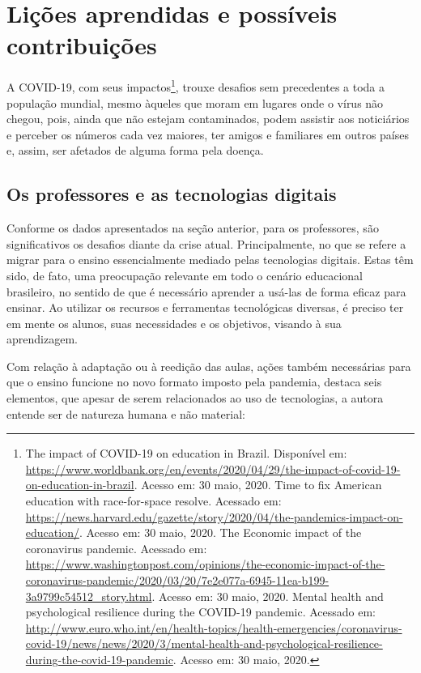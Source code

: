 \documentclass{textolivre}
\begin{document}
\section{Lições aprendidas e possíveis contribuições}\label{sec-licoes}
A COVID-19, com seus impactos\footnote{The impact of COVID-19 on education in Brazil. Disponível em: 
\url{https://www.worldbank.org/en/events/2020/04/29/the-impact-of-covid-19-on-education-in-brazil}. Acesso em: 30 maio, 2020.
Time to fix American education with race-for-space resolve. Acessado em: \url{https://news.harvard.edu/gazette/story/2020/04/the-pandemics-impact-on-education/}. Acesso em: 30 maio, 2020.
The Economic impact of the coronavirus pandemic. Acessado em: \url{https://www.washingtonpost.com/opinions/the-economic-impact-of-the-coronavirus-pandemic/2020/03/20/7e2e077a-6945-11ea-b199-3a9799c54512_story.html}. Acesso em: 30 maio, 2020.
Mental health and psychological resilience during the COVID-19 pandemic. Acessado em: \url{http://www.euro.who.int/en/health-topics/health-emergencies/coronavirus-covid-19/news/news/2020/3/mental-health-and-psychological-resilience-during-the-covid-19-pandemic}. Acesso em: 30 maio, 2020.}, trouxe desafios sem precedentes a toda a população mundial, mesmo àqueles que moram em lugares onde o vírus não chegou, pois, ainda que não estejam contaminados, podem assistir aos noticiários e perceber os números cada vez maiores, ter amigos e familiares em outros países e, assim, ser afetados de alguma forma pela doença.

\subsection{Os professores e as tecnologias digitais}\label{sec-professores}
Conforme os dados apresentados na seção anterior, para os professores, são significativos os desafios diante da crise atual. Principalmente, no que se refere a migrar para o ensino essencialmente mediado pelas tecnologias digitais. Estas têm sido, de fato, uma preocupação relevante em todo o cenário educacional brasileiro, no sentido de que é necessário aprender a usá-las de forma eficaz para ensinar. Ao utilizar os recursos e ferramentas tecnológicas diversas, é preciso ter em mente os alunos, suas necessidades e os objetivos, visando à sua aprendizagem.  

Com relação à adaptação ou à reedição das aulas, ações também necessárias para que o ensino funcione no novo formato imposto pela pandemia, \textcite{ribeiro_escrever_2018} destaca seis elementos, que apesar de serem relacionados ao uso de tecnologias, a autora entende ser de natureza humana e não material:
\end{document}
